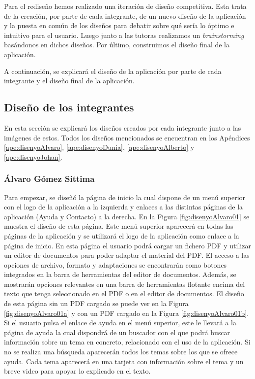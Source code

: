 Para el rediseño hemos realizado una iteración de diseño competitiva. Esta trata de la creación, por parte de cada integrante, de un nuevo diseño de la aplicación y la puesta en común de los diseños para debatir sobre qué sería lo óptimo e intuitivo para el usuario. Luego junto a las tutoras realizamos un \textit{brainstorming} basándonos en dichos diseños. Por último, construimos el diseño final de la aplicación.

A continuación, se explicará el diseño de la aplicación por parte de cada integrante y el diseño final de la aplicación.
\subsection{Diseño de los integrantes}
En esta sección se explicará los diseños creados por cada integrante junto a las imágenes de estos. Todos los diseños mencionados se encuentran en los Apéndices \ref{ape:disenyoAlvaro}, \ref{ape:disenyoDunia}, \ref{ape:disenyoAlberto} y \ref{ape:disenyoJohan}.

\subsubsection{Álvaro Gómez Sittima}
\label{sec:iterAlvaro}
Para empezar, se diseñó la página de inicio la cual dispone de un menú superior con el logo de la aplicación a la izquierda y enlaces a las distintas páginas de la aplicación (Ayuda y Contacto) a la derecha. En la Figura \ref{fig:disenyoAlvaro01} se muestra el diseño de esta página. Este menú superior aparecerá en todas las páginas de la aplicación y se utilizará el logo de la aplicación como enlace a la página de inicio. En esta página el usuario podrá cargar un fichero PDF y utilizar un editor de documentos para poder adaptar el material del PDF. El acceso a las opciones de archivo, formato y adaptaciones se encontrarán como botones integrados en la barra de herramientas del editor de documentos. Además, se mostrarán opciones relevantes en una barra de herramientas flotante encima del texto que tenga seleccionado en el PDF o en el editor de documentos. El diseño de esta página sin un PDF cargado se puede ver en la Figura \ref{fig:disenyoAlvaro01a} y con un PDF cargado en la Figura \ref{fig:disenyoAlvaro01b}. Si el usuario pulsa el enlace de ayuda en el menú superior, este le llevará a la página de ayuda la cual dispondrá de un buscador con el que podrá buscar información sobre un tema en concreto, relacionado con el uso de la aplicación. Si no se realiza una búsqueda aparecerán todos los temas sobre los que se ofrece ayuda. Cada tema aparecerá en una tarjeta con información sobre el tema y un breve video para apoyar lo explicado en el texto.

